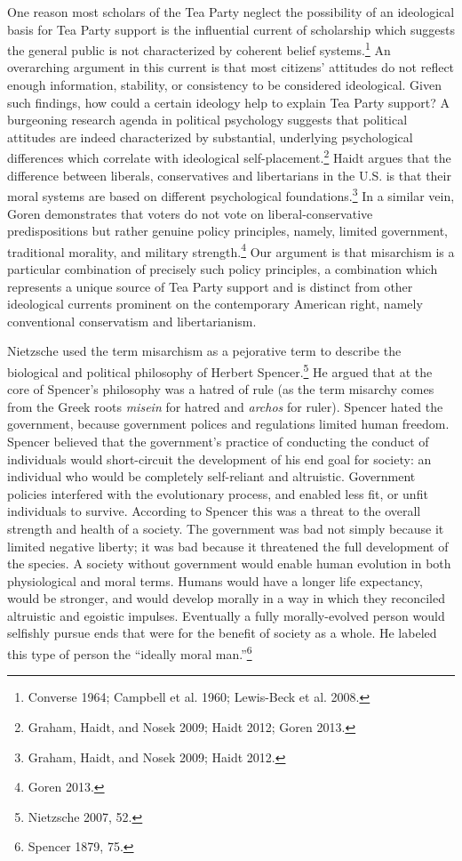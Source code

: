 \documentclass[12pt,]{article}
\begin{document}
One reason most scholars of the Tea Party neglect the possibility of an
ideological basis for Tea Party support is the influential current of
scholarship which suggests the general public is not characterized by
coherent belief systems.\footnote{Converse 1964; Campbell et al. 1960;
  Lewis-Beck et al. 2008. } An overarching argument in this current is
that most citizens' attitudes do not reflect enough information,
stability, or consistency to be considered ideological. Given such
findings, how could a certain ideology help to explain Tea Party
support? A burgeoning research agenda in political psychology suggests
that political attitudes are indeed characterized by substantial,
underlying psychological differences which correlate with ideological
self-placement.\footnote{Graham, Haidt, and Nosek 2009; Haidt 2012;
  Goren 2013. } Haidt argues that the difference between liberals,
conservatives and libertarians in the U.S. is that their moral systems
are based on different psychological foundations.\footnote{Graham,
  Haidt, and Nosek 2009; Haidt 2012. } In a similar vein, Goren
demonstrates that voters do not vote on liberal-conservative
predispositions but rather genuine policy principles, namely, limited
government, traditional morality, and military strength.\footnote{Goren
  2013. } Our argument is that misarchism is a particular combination of
precisely such policy principles, a combination which represents a
unique source of Tea Party support and is distinct from other
ideological currents prominent on the contemporary American right,
namely conventional conservatism and libertarianism.

Nietzsche used the term misarchism as a pejorative term to describe the
biological and political philosophy of Herbert Spencer.\footnote{Nietzsche
  2007, 52. } He argued that at the core of Spencer's philosophy was a
hatred of rule (as the term misarchy comes from the Greek roots
\emph{misein} for hatred and \emph{archos} for ruler). Spencer hated the
government, because government polices and regulations limited human
freedom. Spencer believed that the government's practice of conducting
the conduct of individuals would short-circuit the development of his
end goal for society: an individual who would be completely self-reliant
and altruistic. Government policies interfered with the evolutionary
process, and enabled less fit, or unfit individuals to survive.
According to Spencer this was a threat to the overall strength and
health of a society. The government was bad not simply because it
limited negative liberty; it was bad because it threatened the full
development of the species. A society without government would enable
human evolution in both physiological and moral terms. Humans would have
a longer life expectancy, would be stronger, and would develop morally
in a way in which they reconciled altruistic and egoistic impulses.
Eventually a fully morally-evolved person would selfishly pursue ends
that were for the benefit of society as a whole. He labeled this type of
person the ``ideally moral man.''\footnote{Spencer 1879, 75. }
\end{document}

